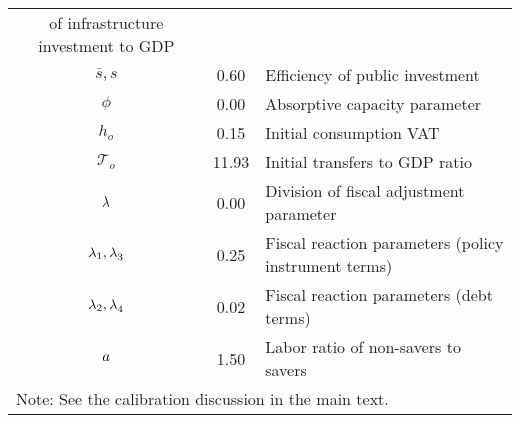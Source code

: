 \documentclass[11pt]{article}
\begin{document}
\begin{center}
\begin{tabular}{ccc}
{of infrastructure investment to GDP} \\ 
$\bar{s},s$ & {\small 0.60} & \multicolumn{1}{l}{\small Efficiency of public
investment} \\ 
$\phi $ & {\small 0.00} & \multicolumn{1}{l}{\small Absorptive capacity
parameter} \\ 
$h_{o}$ & {\small 0.15} & \multicolumn{1}{l}{\small Initial consumption VAT}
\\ 
$\mathcal{T}_{o}$ & {\small 11.93} & \multicolumn{1}{l}{\small Initial
transfers to GDP ratio} \\ 
${\small \lambda }$ & {\small 0.00} & \multicolumn{1}{l}{\small Division of
fiscal adjustment parameter} \\ 
${\small \lambda }_{1}{\small ,\lambda }_{3}$ & {\small 0.25} & 
\multicolumn{1}{l}{\small Fiscal reaction parameters (policy instrument
terms)} \\ 
${\small \lambda }_{2}{\small ,\lambda }_{4}$ & {\small 0.02} & 
\multicolumn{1}{l}{\small Fiscal reaction parameters (debt terms)} \\ 
${\small a}$ & {\small 1.50} & \multicolumn{1}{l}{\small Labor ratio of
non-savers to savers} \\ \hline
\multicolumn{3}{l}{\small Note: See the calibration discussion in the main
text.}%
\end{tabular}
\end{center}
\end{document}
